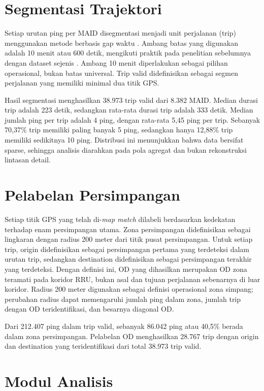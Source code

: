 \section{Segmentasi Trajektori}

Setiap urutan ping per MAID disegmentasi menjadi unit perjalanan (trip) menggunakan metode berbasis gap waktu \cite{zheng2015}. Ambang batas yang digunakan adalah 10 menit atau 600 detik, mengikuti praktik pada penelitian sebelumnya dengan dataset sejenis \cite{nurlita2024}. Ambang 10 menit diperlakukan sebagai pilihan operasional, bukan batas universal. Trip valid didefinisikan sebagai segmen perjalanan yang memiliki minimal dua titik GPS.

Hasil segmentasi menghasilkan 38.973 trip valid dari 8.382 MAID. Median durasi trip adalah 223 detik, sedangkan rata-rata durasi trip adalah 333 detik. Median jumlah ping per trip adalah 4 ping, dengan rata-rata 5,45 ping per trip. Sebanyak 70,37\% trip memiliki paling banyak 5 ping, sedangkan hanya 12,88\% trip memiliki sedikitnya 10 ping. Distribusi ini menunjukkan bahwa data bersifat sparse, sehingga analisis diarahkan pada pola agregat dan bukan rekonstruksi lintasan detail.

\section{Pelabelan Persimpangan}

Setiap titik GPS yang telah di-\textit{map match} dilabeli berdasarkan kedekatan terhadap enam persimpangan utama. Zona persimpangan didefinisikan sebagai lingkaran dengan radius 200 meter dari titik pusat persimpangan. Untuk setiap trip, origin didefinisikan sebagai persimpangan pertama yang terdeteksi dalam urutan trip, sedangkan destination didefinisikan sebagai persimpangan terakhir yang terdeteksi. Dengan definisi ini, OD yang dihasilkan merupakan OD zona teramati pada koridor RRU, bukan asal dan tujuan perjalanan sebenarnya di luar koridor. Radius 200 meter digunakan sebagai definisi operasional zona simpang; perubahan radius dapat memengaruhi jumlah ping dalam zona, jumlah trip dengan OD teridentifikasi, dan besarnya diagonal OD.

Dari 212.407 ping dalam trip valid, sebanyak 86.042 ping atau 40,5\% berada dalam zona persimpangan. Pelabelan OD menghasilkan 28.767 trip dengan origin dan destination yang teridentifikasi dari total 38.973 trip valid.

\section{Modul Analisis}

